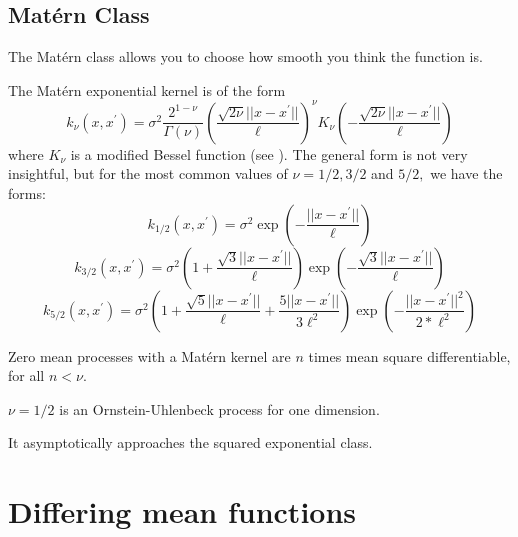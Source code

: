 \begin{figure}
\end{figure}


\begin{figure}
\end{figure}

\subsection*{Mat\'{e}rn Class}

The Mat\'ern class allows you to choose how smooth you think the function is.

The Mat\'ern exponential kernel is of the form
$$k_\nu(x, x^\prime)
    = \sigma^2\frac{2^{1 - \nu}}{\Gamma(\nu)}
    \left(\frac{\sqrt{2\nu}||x - x^\prime||}{\ell}\right)^\nu
    K_\nu\left(-\frac{\sqrt{2\nu}||x - x^\prime||}{\ell}\right)$$
where $K_\nu$ is a modified Bessel function (see \cite[374]{abramowitz_handbook_2013}). The general form is not very insightful, but for the most common values of $\nu = 1/2, 3/2$ and $5/2,$ we have the forms:
$$k_{1/2}(x, x^\prime)
= \sigma^2\exp\left(-\frac{||x - x^\prime||}{\ell}\right)$$
$$k_{3/2}(x, x^\prime)
    = \sigma^2
    \left(1 + \frac{\sqrt{3}||x - x^\prime||}{\ell}\right)
    \exp\left(-\frac{\sqrt{3}||x - x^\prime||}{\ell}\right)$$
$$k_{5/2}(x, x^\prime)
    = \sigma^2
    \left(1 + \frac{\sqrt{5}||x - x^\prime||}{\ell} + \frac{5||x - x^\prime||}{3\ell^2}\right)
    \exp\left(-\frac{||x - x^\prime||^2}{2*\ell^2}\right)$$

Zero mean processes with a Mat\'ern kernel are $n$ times mean square differentiable, for all $n < \nu.$

$\nu = 1/2$ is an Ornstein-Uhlenbeck process for one dimension.

It asymptotically approaches the squared exponential class.



\begin{figure}
\end{figure}

\section{Differing mean functions}


\begin{figure}
\end{figure}